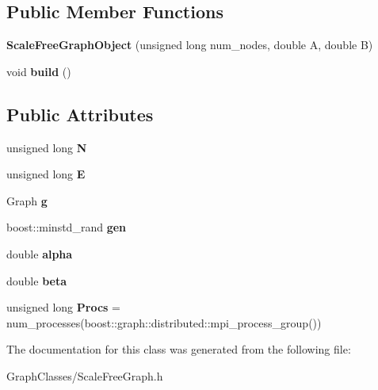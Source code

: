 \subsection*{Public Member Functions}
\begin{DoxyCompactItemize}
\item 
\mbox{\label{classScaleFreeGraphObject_aabfcbf560a4154b2132b385fe9d76e2b}} 
{\bfseries Scale\+Free\+Graph\+Object} (unsigned long num\+\_\+nodes, double A, double B)
\item 
\mbox{\label{classScaleFreeGraphObject_ae45db0e0a2a87c7a8f7c06d0da2b02ab}} 
void {\bfseries build} ()
\end{DoxyCompactItemize}
\subsection*{Public Attributes}
\begin{DoxyCompactItemize}
\item 
\mbox{\label{classScaleFreeGraphObject_a4c692efd6288d5550efc485d3c977a2d}} 
unsigned long {\bfseries N}
\item 
\mbox{\label{classScaleFreeGraphObject_ae308484fcb176ee722d780b8ac746523}} 
unsigned long {\bfseries E}
\item 
\mbox{\label{classScaleFreeGraphObject_a028a9a080967563fc817d69315d1dac5}} 
Graph {\bfseries g}
\item 
\mbox{\label{classScaleFreeGraphObject_a5088520127236e2b2be8d7562d8d7dbc}} 
boost\+::minstd\+\_\+rand {\bfseries gen}
\item 
\mbox{\label{classScaleFreeGraphObject_a0526d8a58e827cb697c9620674eaf679}} 
double {\bfseries alpha}
\item 
\mbox{\label{classScaleFreeGraphObject_a984fff771258c24b7620c6e946355135}} 
double {\bfseries beta}
\item 
\mbox{\label{classScaleFreeGraphObject_aad974e5ca047974d16d886662c2b06ee}} 
unsigned long {\bfseries Procs} = num\+\_\+processes(boost\+::graph\+::distributed\+::mpi\+\_\+process\+\_\+group())
\end{DoxyCompactItemize}


The documentation for this class was generated from the following file\+:\begin{DoxyCompactItemize}
\item 
Graph\+Classes/Scale\+Free\+Graph.\+h\end{DoxyCompactItemize}
